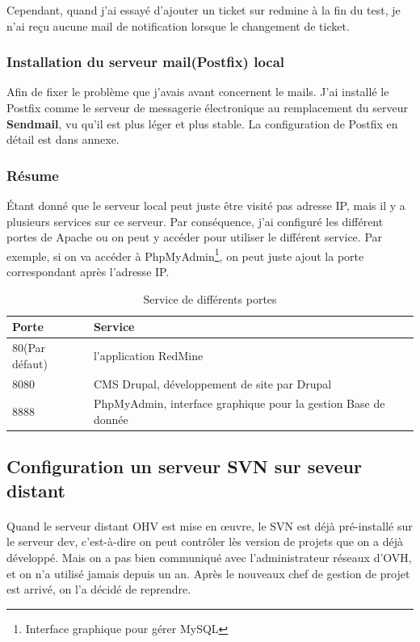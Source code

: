 Cependant, quand j'ai essayé d'ajouter un ticket sur redmine à la fin du test, je n'ai reçu aucune  mail de notification lorsque le changement de ticket.

\subsubsection{Installation du serveur mail(Postfix) local}
Afin de fixer le problème que j'avais avant concernent le mails. J'ai installé le Postfix comme le serveur de messagerie électronique au remplacement du serveur \textbf{Sendmail}, vu qu'il est plus léger et plus stable. La configuration de Postfix en détail est dans annexe.

\subsubsection{Résume}
Étant donné que le serveur local peut juste être visité pas adresse IP, mais il y a plusieurs services sur ce serveur. Par conséquence, j'ai configuré les différent portes de Apache ou on peut y accéder pour utiliser le différent service. Par exemple, si on va accéder à PhpMyAdmin\footnote{Interface graphique pour gérer MySQL}, on peut juste ajout la porte correspondant après l'adresse IP.

\begin{table}[htbp]
\centering
\begin{tabular}{ll}
  \toprule
  Porte & Service\\
  \midrule
	80(Par défaut) & l'application RedMine \\ 	 
	8080 & CMS Drupal, développement de site par Drupal \\ 	 
	8888 & PhpMyAdmin, interface graphique pour la gestion Base de donnée \\ 	 
  \bottomrule
\end{tabular}
 \caption{Service de différents portes}
\end{table}

\subsection{Configuration un serveur SVN sur seveur distant}
\paragraph{}
Quand le serveur distant OHV est mise en œuvre, le SVN est déjà pré-installé sur le serveur dev, c'est-à-dire on peut contrôler lès version de projets que on a déjà développé. Mais on a pas bien communiqué avec l'administrateur réseaux d'OVH, et on n'a utilisé jamais depuis un an. Après le nouveaux chef de gestion de projet est arrivé, on l'a décidé de reprendre. 

